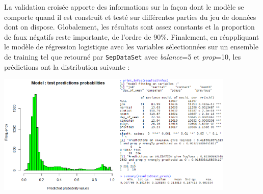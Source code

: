 \documentclass[]{article}
\begin{document}
\par La validation croisée apporte des informations sur la façon dont le modèle se comporte quand il est construit et testé sur différentes parties du jeu de données dont on dispose. Globalement, les résultats sont assez constants et la proportion de faux négatifs reste importante, de l'ordre de 90\%. Finalement, en réappliquant le modèle de régression logistique avec les variables sélectionnées sur un ensemble de training tel que retourné par \texttt{SepDataSet} avec \textit{balance}=5 et \textit{prop}=10, les prédictions ont la distribution suivante :

\begin{center}
\includegraphics[height=5.75cm]{preds_test}
\end{center}
\end{document}

